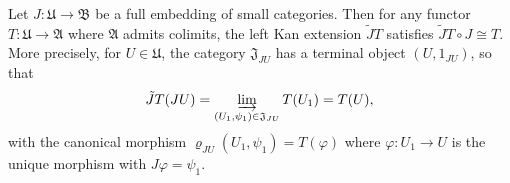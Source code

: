 Let $J: \mathfrak{U} \rightarrow \mathfrak{B}$ be a full embedding of small categories. Then for any functor $T: \mathfrak{U} \rightarrow \mathfrak{A}$ where $\mathfrak{A}$ admits colimits, the left Kan extension $\tilde{J}T$ satisfies $\tilde{J}T \circ J \cong T$. More precisely, for $U \in \mathfrak{U}$, the category $\mathfrak{J}_{JU}$ has a terminal object $(U, 1_{JU})$, so that
$$
\tilde{J}T(JU) = \varinjlim_{(U_1, \psi_1) \in \mathfrak{J}_{JU}} T(U_1) = T(U),
$$
with the canonical morphism $\varrho_{JU}(U_1, \psi_1) = T(\varphi)$ where $\varphi: U_1 \rightarrow U$ is the unique morphism with $J\varphi = \psi_1$.
